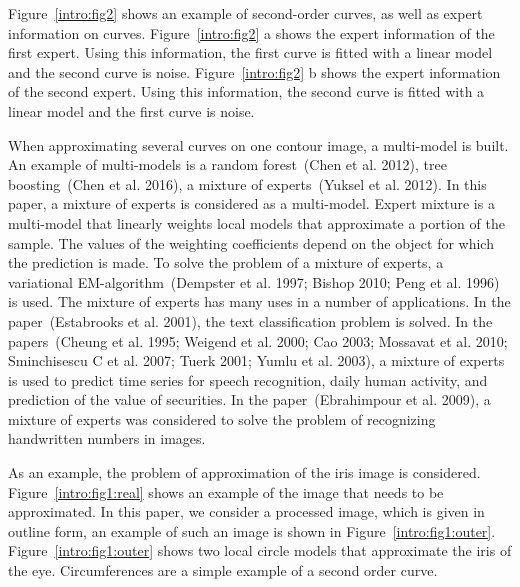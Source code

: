 Figure~\ref{intro:fig2} shows an example of second-order curves, as well as expert information on curves. Figure~\ref{intro:fig2} a shows the expert information of the first expert. Using this information, the first curve is fitted with a linear model and the second curve is noise. Figure~\ref{intro:fig2} b shows the expert information of the second expert. Using this information, the second curve is fitted with a linear model and the first curve is noise.

When approximating several curves on one contour image, a multi-model is built. An example of multi-models is a random forest~(Chen et al. 2012), tree boosting~(Chen et al. 2016), a mixture of experts~(Yuksel et al. 2012). In this paper, a mixture of experts is considered as a multi-model. Expert mixture is a multi-model that linearly weights local models that approximate a portion of the sample. The values of the weighting coefficients depend on the object for which the prediction is made. To solve the problem of a mixture of experts, a variational EM-algorithm~(Dempster et al. 1997; Bishop 2010; Peng et al. 1996) is used. The mixture of experts has many uses in a number of applications. In the paper~(Estabrooks et al. 2001), the text classification problem is solved. In the papers~(Cheung et al. 1995; Weigend et al. 2000; Cao 2003; Mossavat et al. 2010; Sminchisescu C et al. 2007; Tuerk 2001; Yumlu et al. 2003), a mixture of experts is used to predict time series for speech recognition, daily human activity, and prediction of the value of securities. In the paper~(Ebrahimpour et al. 2009), a mixture of experts was considered to solve the problem of recognizing handwritten numbers in images.

As an example, the problem of approximation of the iris image is considered. Figure~\ref{intro:fig1:real} shows an example of the image that needs to be approximated. In this paper, we consider a processed image, which is given in outline form, an example of such an image is shown in Figure~\ref{intro:fig1:outer}. Figure~\ref{intro:fig1:outer} shows two local circle models that approximate the iris of the eye. Circumferences are a simple example of a second order curve.

